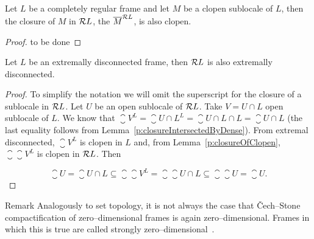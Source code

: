 \begin{lemma}\label{p:closureOfClopen}
    Let $L$ be a completely regular frame and let $M$ be a clopen sublocale of $L$, then the closure of $M$ in $\mathcal{R} L$, the $\overline{M}^{\mathcal{R} L}$, is also clopen.
\end{lemma}
\begin{proof}
to be done
\end{proof}

\begin{proposition}\label{p:extrDiscPreserv}
    Let $L$ be an extremally disconnected frame, then $\mathcal{R} L$ is also extremally disconnected.
\end{proposition}
\begin{proof}
    To simplify the notation we will omit the superscript for the closure of a sublocale in $\mathcal{R} L$. Let $U$ be an open sublocale of $\mathcal{R} L$. Take $V = U\cap L$ open sublocale of $L$. We know that $\closure V^L = \closure{U\cap L}^L = \closure{U\cap L}\cap L = \closure U\cap L$ (the last equality follows from Lemma~\ref{p:closureIntersectedByDense}). From extremal disconnected, $\closure V^L$ is clopen in $L$ and, from Lemma~\ref{p:closureOfClopen}, $\closure{\closure V^L}$ is clopen in $\mathcal{R} L$. Then

    $$ \closure U = \closure{U\cap L} \subseteq \closure{\closure{V}^L} = \closure{\closure U\cap L} \subseteq \closure{\closure U} = \closure U.$$
\end{proof}

\begin{block}{Remark}
    Analogously to set topology, it is not always the case that Čech--Stone compactification of zero--dimensional frames is again zero--dimensional. Frames in which this is true are called strongly zero--dimensional~\cite{kou2002strongly}.
\end{block}


